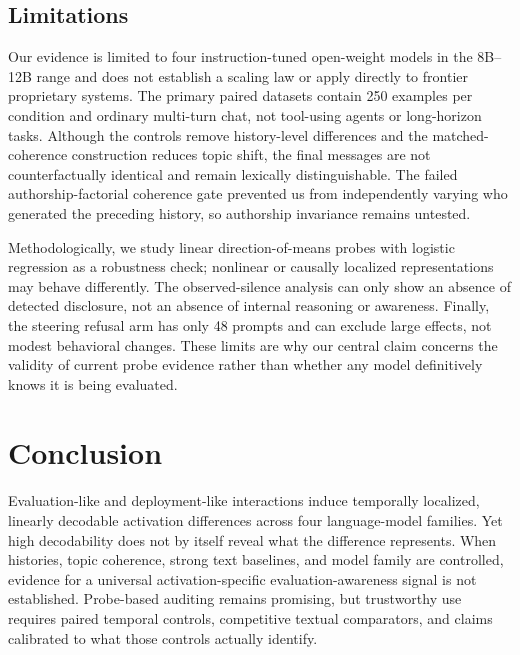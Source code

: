 \documentclass{article}
\begin{document}
\subsection{Limitations}

Our evidence is limited to four instruction-tuned open-weight models in the
8B--12B range and does not establish a scaling law or apply directly to
frontier proprietary systems. The primary paired datasets contain 250 examples
per condition and ordinary multi-turn chat, not tool-using agents or long-horizon
tasks. Although the controls remove history-level differences and the
matched-coherence construction reduces topic shift, the final messages are not
counterfactually identical and remain lexically distinguishable. The failed
authorship-factorial coherence gate prevented us from independently varying who
generated the preceding history, so authorship invariance remains untested.

Methodologically, we study linear direction-of-means probes with logistic
regression as a robustness check; nonlinear or causally localized
representations may behave differently. The observed-silence analysis can only
show an absence of detected disclosure, not an absence of internal reasoning or
awareness. Finally, the steering refusal arm has only 48 prompts and can exclude
large effects, not modest behavioral changes. These limits are why our central
claim concerns the validity of current probe evidence rather than whether any
model definitively knows it is being evaluated.

\section{Conclusion}

Evaluation-like and deployment-like interactions induce temporally localized,
linearly decodable activation differences across four language-model families.
Yet high decodability does not by itself reveal what the difference represents.
When histories, topic coherence, strong text baselines, and model family are
controlled, evidence for a universal activation-specific evaluation-awareness
signal is not established. Probe-based auditing remains promising, but
trustworthy use requires paired temporal controls, competitive textual
comparators, and claims calibrated to what those controls actually identify.




\appendix
\end{document}
